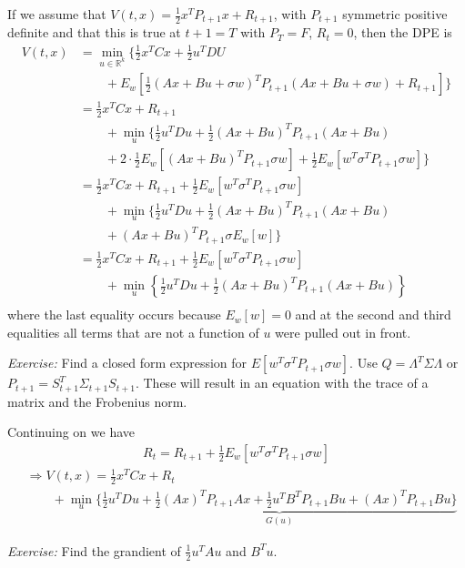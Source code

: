 If we assume that $V(t,x) = \frac{1}{2}x^TP_{t+1}x + R_{t+1}$, with $P_{t+1}$ symmetric positive definite and that this is true at $t+1=T$ with $P_T=F$, $R_t=0$, then the DPE is
\begin{align*}
V(t,x) &= \min_{u\in\mathbb{R}^k}\{\frac{1}{2}x^TCx + \frac{1}{2}u^TDU  \\
&\qquad + E_w[\frac{1}{2}(Ax+Bu+\sigma w)^TP_{t+1}(Ax+Bu+\sigma w) + R_{t+1}]\} \\
&= \frac{1}{2}x^TCx + R_{t+1} \\
&\qquad + \min_u \{\frac{1}{2}u^TDu + \frac{1}{2}(Ax+Bu)^TP_{t+1}(Ax+Bu) \\
&\qquad + 2\cdot\frac{1}{2}E_w[(Ax+Bu)^TP_{t+1}\sigma w] + \frac{1}{2}E_w[w^T\sigma^TP_{t+1}\sigma w]\} \\
&= \frac{1}{2}x^TCx + R_{t+1} + \frac{1}{2}E_w[w^T\sigma^TP_{t+1}\sigma w] \\
&\qquad + \min_u \{ \frac{1}{2}u^TDu + \frac{1}{2}(Ax+Bu)^TP_{t+1}(Ax+Bu) \\
&\qquad + (Ax+Bu)^TP_{t+1}\sigma E_w[w] \} \\
&= \frac{1}{2}x^TCx + R_{t+1} + \frac{1}{2}E_w[w^T\sigma^TP_{t+1}\sigma w] \\
&\qquad + \min_u \left\lbrace \frac{1}{2}u^TDu + \frac{1}{2}(Ax+Bu)^TP_{t+1}(Ax+Bu) \right\rbrace \\
\end{align*}
where the last equality occurs because $E_w[w]=0$ and at the second and third equalities all terms that are not a function of $u$ were pulled out in front.

\textit{Exercise:} Find a closed form expression for $E[w^T\sigma^TP_{t+1}\sigma w]$. Use $Q=\Lambda^T\Sigma\Lambda$ or $P_{t+1} = S_{t+1}^T\Sigma_{t+1}S_{t+1}$. These will result in an equation with the trace of a matrix and the Frobenius norm.

Continuing on we have
\begin{align*}
R_t = R_{t+1} + \frac{1}{2}E_w[w^T\sigma^TP_{t+1}\sigma w]
\end{align*}
\begin{align*}
&\Rightarrow V(t,x) = \frac{1}{2}x^TCx + R_t \\
&\qquad + \min_u\{ \underbrace{\frac{1}{2}u^TDu + \frac{1}{2}(Ax)^TP_{t+1}Ax + \frac{1}{2}u^TB^TP_{t+1}Bu + (Ax)^TP_{t+1}Bu\}}_{G(u)}
\end{align*}

\textit{Exercise:} Find the grandient of $\frac{1}{2}u^TAu$ and $B^Tu$.

